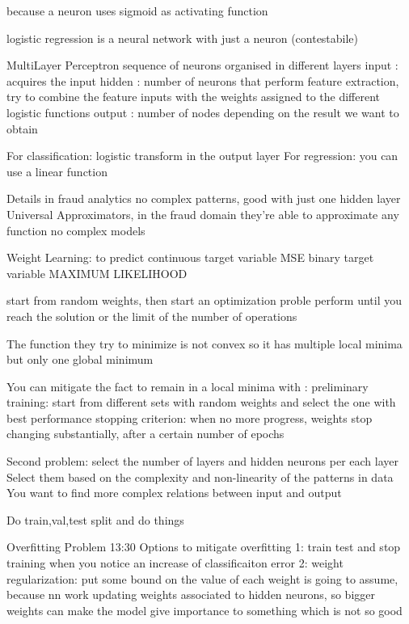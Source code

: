        because a neuron uses sigmoid as activating function 

        logistic regression is a neural network with just a neuron (contestabile)


        MultiLayer Perceptron 
            sequence of neurons organised in different layers 
                input : acquires the input
                hidden : number of neurons that perform feature extraction, try to combine the feature inputs with the weights assigned to the different logistic functions 
                output : number of nodes depending on the result we want to obtain
            
            For classification: logistic transform in the output layer 
            For regression: you can use a linear function 

        Details 
            in fraud analytics no complex patterns, good with just one hidden layer 
            Universal Approximators, in the fraud domain they're able to approximate any function 
            no complex models 

        Weight Learning:
            to predict continuous target variable MSE 
            binary target variable MAXIMUM LIKELIHOOD 

            start from random weights, then start an optimization proble 
            perform until you reach the solution or the limit of the number of operations 

            The function they try to minimize is not convex so it has multiple local minima but only one global minimum

            You can mitigate the fact to remain in a local minima with :
                preliminary training: start from different sets with random weights and select the one with best performance 
                stopping criterion: when no more progress, weights stop changing substantially, after a certain number of epochs 
        
        Second problem: select the number of layers and hidden neurons per each layer 
            Select them based on the complexity and non-linearity of the patterns in data 
            You want to find more complex relations between input and output 

            Do train,val,test split and do things 

        Overfitting Problem 
            13:30
            Options to mitigate overfitting 
             1: train test and stop training when you notice an increase of classificaiton error 
             2: weight regularization: put some bound on the value of each weight is going to assume, because 
                                        nn work updating weights associated to hidden neurons, so bigger weights can 
                                        make the model give importance to something which is not so good 
        
